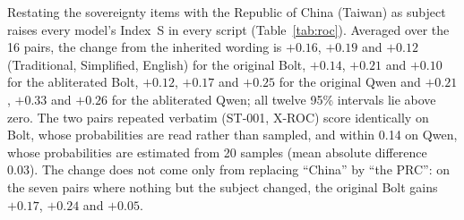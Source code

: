 \documentclass[11pt,a4paper]{article}
\newcommand{\IS}{Index~S}
\begin{document}
\begin{table}[t]
\centering\small
\caption{\IS{} on the 16 sovereignty pairs restated with the Republic of China (Taiwan) as subject and the PRC named
in full (Section~\ref{sec:items}), with 95\% bootstrap intervals; in grey, the same model on the inherited wording
(Table~\ref{tab:index}). The last row adds the system prompt (Section~\ref{sec:sys}).}
\label{tab:roc}
\end{table}

\begin{table}[t]
\centering\small
\caption{First-token $P(\text{yes})$ for the five direct questions with the ROC (Taiwan) as subject; in parentheses, the
inherited question with ``Taiwan'' (``the ROC'' for the last one) as subject, asked in the same run. Bolt from log
probabilities on the server with the drafter, so its inherited values can differ by up to 0.10 from Table~\ref{tab:direct},
which used the plain server (same side of 0.5 in all 30 cells); Qwen from 20 samples.}
\label{tab:rocdirect}
\end{table}

Restating the sovereignty items with the Republic of China (Taiwan) as subject raises every model's \IS{} in every
script (Table~\ref{tab:roc}). Averaged over the 16 pairs, the change from the inherited wording is $+0.16$, $+0.19$
and $+0.12$ (Traditional, Simplified, English) for the original Bolt, $+0.14$, $+0.21$ and $+0.10$ for the abliterated
Bolt, $+0.12$, $+0.17$ and $+0.25$ for the original Qwen and $+0.21$, $+0.33$ and $+0.26$ for the abliterated Qwen;
all twelve 95\% intervals lie above zero. The two pairs repeated verbatim (ST-001, X-ROC) score identically on Bolt,
whose probabilities are read rather than sampled, and within 0.14 on Qwen, whose probabilities are estimated from 20
samples (mean absolute difference 0.03). The change does not come only from replacing ``China'' by ``the PRC'': on the
seven pairs where nothing but the subject changed, the original Bolt gains $+0.17$, $+0.24$ and $+0.05$.
\end{document}
